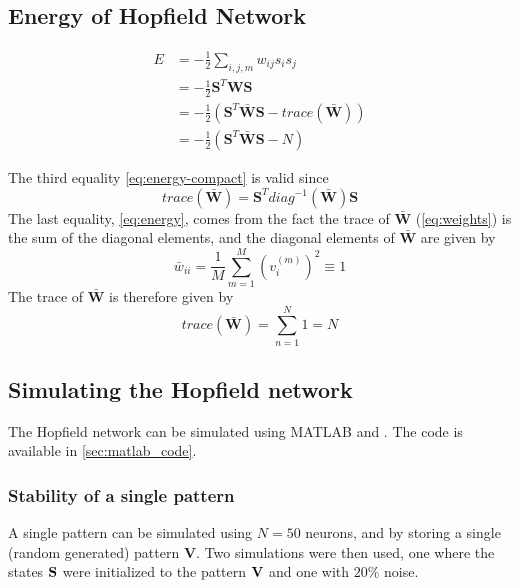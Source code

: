 \subsection{Energy of Hopfield Network}
\begin{tcolorbox}
    \begin{subequations}\label{eq:energy}
        \begin{align}
        E &= -\frac{1}{2} \sum_{i,j,m} w_{ij}s_i s_j \\
        &= - \frac{1}{2} \mathbf{S}^T \mathbf{W} \mathbf{S} \\
        &= -\frac{1}{2}( \mathbf{S}^T \bar{\mathbf{W}} \mathbf{S} - trace(\bar{\mathbf{W}})) \label{eq:energy-trace} \\ 
        &= -\frac{1}{2}(\mathbf{S}^T \bar{\mathbf{W}} \mathbf{S} - N) \label{eq:energy-compact}
        \end{align}
    \end{subequations}
\end{tcolorbox}
The third equality \cref{eq:energy-compact} is valid since 
\begin{equation}
    trace(\bar{\mathbf{W}}) = \mathbf{S}^T diag^{-1}(\bar{\mathbf{W}})\mathbf{S}
\end{equation}
The last equality, \cref{eq:energy}, comes from the fact the trace of $\bar{\mathbf{W}}$ (\cref{eq:weights}) is the sum of the diagonal elements, and the diagonal elements of $\bar{\mathbf{W}}$ are given by
\begin{equation}
    \bar{w}_{ii} = \frac{1}{M} \sum_{m=1}^M (v_i^{(m)})^2 \equiv 1
\end{equation}
The trace of $\bar{\mathbf{W}}$ is therefore given by 
\begin{equation}
    trace(\bar{\mathbf{W}}) = \sum_{n=1}^N 1 = N
\end{equation}


\subsection{Simulating the Hopfield network}
The Hopfield network can be simulated using MATLAB and . The code is available in \cref{sec:matlab_code}.
\subsubsection*{Stability of a single pattern}
A single pattern can be simulated using $N=50$ neurons, and by storing a single (random generated) pattern $\mathbf{V}$. Two simulations were then used, one where the states $\bf S$ were initialized to the pattern $\bf V$ and one with $20\%$ noise.
